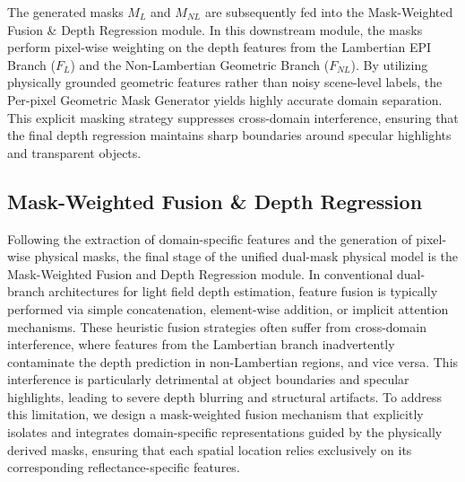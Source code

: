 \documentclass[lettersize,journal]{IEEEtran}
\begin{document}
The generated masks $M_L$ and $M_{NL}$ are subsequently fed into the Mask-Weighted Fusion \& Depth Regression module. In this downstream module, the masks perform pixel-wise weighting on the depth features from the Lambertian EPI Branch ($F_L$) and the Non-Lambertian Geometric Branch ($F_{NL}$). By utilizing physically grounded geometric features rather than noisy scene-level labels, the Per-pixel Geometric Mask Generator yields highly accurate domain separation. This explicit masking strategy suppresses cross-domain interference, ensuring that the final depth regression maintains sharp boundaries around specular highlights and transparent objects.

\subsection{Mask-Weighted Fusion \& Depth Regression}

Following the extraction of domain-specific features and the generation of pixel-wise physical masks, the final stage of the unified dual-mask physical model is the Mask-Weighted Fusion and Depth Regression module. In conventional dual-branch architectures for light field depth estimation, feature fusion is typically performed via simple concatenation, element-wise addition, or implicit attention mechanisms. These heuristic fusion strategies often suffer from cross-domain interference, where features from the Lambertian branch inadvertently contaminate the depth prediction in non-Lambertian regions, and vice versa. This interference is particularly detrimental at object boundaries and specular highlights, leading to severe depth blurring and structural artifacts. To address this limitation, we design a mask-weighted fusion mechanism that explicitly isolates and integrates domain-specific representations guided by the physically derived masks, ensuring that each spatial location relies exclusively on its corresponding reflectance-specific features.
\end{document}
